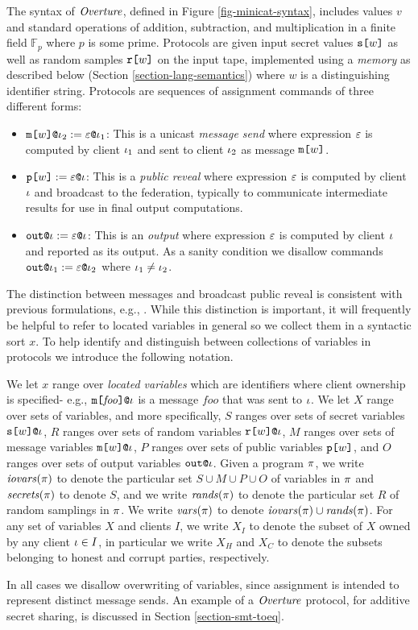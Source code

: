 The syntax of $\mathit{Overture}$, defined in Figure \ref{fig-minicat-syntax},
includes values $v$ and standard operations of addition, subtraction,
and multiplication in a finite field $\mathbb{F}_p$ where $p$ is some
prime. Protocols are given input secret values $\texttt{s[}w\texttt{]}$ as well
as random samples $\texttt{r[}w\texttt{]}$ on the input tape, implemented using a
\emph{memory} as described below (Section
\ref{section-lang-semantics}) where $w$ is a distinguishing 
identifier string. Protocols are sequences of assignment commands of three
different forms:
\begin{itemize}
\item $\texttt{m[}w\texttt{]}\texttt{@}\iota_2 := \varepsilon\texttt{@}\iota_1$: This
  is a unicast \emph{message send} where expression $\varepsilon$ is computed
  by client $\iota_1$ and sent to client $\iota_2$ as message
  $\texttt{m[}w\texttt{]}$.
\item $\texttt{p[}w\texttt{]} := \varepsilon\texttt{@}\iota$: This
  is a \emph{public reveal} where expression $\varepsilon$ is computed
  by client $\iota$ and broadcast to the federation, typically
  to communicate intermediate results for use in final output
  computations.
\item $\texttt{out}\texttt{@}\iota := \varepsilon\texttt{@}\iota$: This
  is an \emph{output} where expression $\varepsilon$ is computed
  by client $\iota$ and reported as its output. As a
  sanity condition we disallow commands
  $\texttt{out}\texttt{@}\iota_1 := \varepsilon\texttt{@}\iota_2$ where $\iota_1\ne\iota_2$.
\end{itemize}
The distinction between
messages and broadcast public reveal is consistent with previous
formulations, e.g., \cite{6266151}. While this distinction is important,
it will frequently be helpful to refer to located variables in general
so we collect them in a syntactic sort $x$. To help identify and distinguish
between collections of variables in protocols we introduce the
following notation.
\begin{definition}
We let $x$ range over \emph{located variables} which are identifiers where
client ownership is specified- e.g.,
$\texttt{m[}\mathit{foo}\texttt{]}\texttt{@}\iota$ is a message $\mathit{foo}$ that
was sent to $\iota$. We let $X$ range over sets of variables, and more
specifically, $S$ ranges over sets of secret variables
$\texttt{s[}w\texttt{]}\texttt{@}\iota$, $R$ ranges over sets of random variables
$\texttt{r[}w\texttt{]}\texttt{@}\iota$, $M$ ranges over sets of message variables
$\texttt{m[}w\texttt{]}\texttt{@}\iota$, $P$ ranges over sets of public variables
$\texttt{p[}w\texttt{]}$, and $O$ ranges over sets of output variables $\texttt{out}\texttt{@}\iota$.
Given a program $\pi$, we write $\mathit{iovars}(\pi)$ to denote the
particular set $S \cup M \cup P \cup O$ of variables in $\pi$ and
$\mathit{secrets}(\pi)$ to denote $S$, and we write $\mathit{rands}(\pi)$ to
denote the particular set $R$ of random samplings in $\pi$. We write
$\mathit{vars}(\pi)$ to denote $\mathit{iovars}(\pi) \cup \mathit{rands}(\pi)$. For any set
of variables $X$ and clients $I$, we write $X_I$ to denote the subset
of $X$ owned by any client $\iota \in I$, in particular we write $X_H$
and $X_C$ to denote the subsets belonging to honest and corrupt
parties, respectively.
\end{definition}
In all cases we disallow overwriting of variables, since assignment is
intended to represent distinct message sends. An example of a
$\mathit{Overture}$ protocol, for additive secret sharing, is discussed in
Section \ref{section-smt-toeq}.


